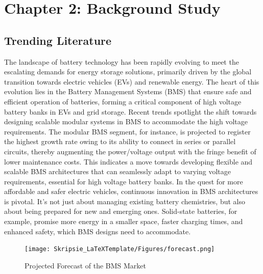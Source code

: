 \chapter[Background Study]{Chapter 2: Background Study}\label{chap:BG_Study} %
\section{Trending Literature}\label{sec:media1} %
The landscape of battery technology has been rapidly evolving to meet the escalating demands for energy storage solutions, primarily driven by the global transition towards electric vehicles (EVs) and renewable energy. The heart of this evolution lies in the Battery Management Systems (BMS) that ensure safe and efficient operation of batteries, forming a critical component of high voltage battery banks in EVs and grid storage.\newline\newline
\noindent
Recent trends spotlight the shift towards designing scalable modular systems in BMS to accommodate the high voltage requirements. The modular BMS segment, for instance, is projected to register the highest growth rate owing to its ability to connect in series or parallel circuits, thereby augmenting the power/voltage output with the fringe benefit of lower maintenance costs\cite{GlobeNewswire2023}. This indicates a move towards developing flexible and scalable BMS architectures that can seamlessly adapt to varying voltage requirements, essential for high voltage battery banks.\newline\newline
\noindent
In the quest for more affordable and safer electric vehicles, continuous innovation in BMS architectures is pivotal. It's not just about managing existing battery chemistries, but also about being prepared for new and emerging ones. Solid-state batteries, for example, promise more energy in a smaller space, faster charging times, and enhanced safety, which BMS designs need to accommodate\cite{MITTechReview2023}.\newline
\begin{figure}[h!]
\centering
\texttt{[image: Skripsie\_LaTeXTemplate/Figures/forecast.png]}
\caption{Projected Forecast of the BMS Market \cite{m_and_m}}
\label{fig:grow_some}
\end{figure}
